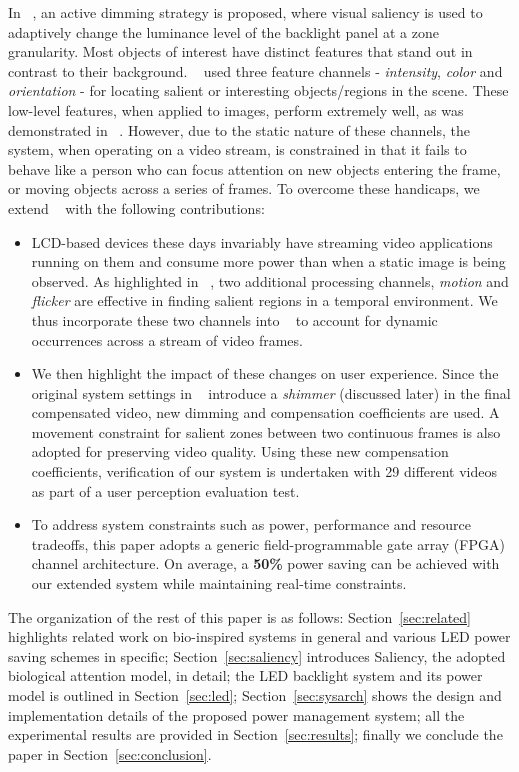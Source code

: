 In ~\cite{DATE2013}, an active dimming strategy is proposed, where visual saliency 
is used to adaptively change the luminance level of the backlight panel at a zone granularity. Most objects of interest
have distinct features that stand out in contrast to their background. 
~\cite{DATE2013} used three feature channels - \emph{intensity}, \emph{color} and \emph{orientation} - for locating salient or 
interesting objects/regions in the scene. These low-level features, when applied to images, 
perform extremely well, as was demonstrated in ~\cite{DATE2013}. However, due to the static nature of these 
channels, the system, when operating on a video stream, is constrained in that it fails to behave 
like a person who can focus attention on new objects entering the frame, or moving objects across a series of frames. 
To overcome these handicaps, we extend ~\cite{DATE2013} with the following contributions:
\begin{itemize}
\item
LCD-based devices these days invariably have streaming video applications running on them and consume more power than when a static image is being observed. 
As highlighted in ~\cite{Peters2007}, two additional processing channels, \emph{motion} and \emph{flicker} are effective in finding salient regions 
in a temporal environment. We thus incorporate these two channels into ~\cite{DATE2013} to account for dynamic occurrences 
across a stream of video frames.
\item
We then highlight the impact of these changes on user experience. 
Since the original system settings in ~\cite{DATE2013} introduce a \emph{shimmer} (discussed later) in the final compensated video, 
new dimming and compensation coefficients are used. A movement constraint for salient zones between two 
continuous frames is also adopted for preserving video quality.
Using these new compensation coefficients, verification of our system is undertaken with 29 different videos as part of a user perception evaluation test.
\item 
To address system constraints such as power, performance and resource tradeoffs,
this paper adopts a generic field-programmable gate array (FPGA) channel architecture. 
On average, a \textbf{50\%} power saving can be achieved with our extended system while maintaining real-time constraints. 
\end{itemize}
The organization of the rest of this paper is as follows: Section~\ref{sec:related} highlights related work on bio-inspired systems in general and various LED power saving schemes in specific; Section~\ref{sec:saliency} introduces Saliency, the adopted biological attention model, in detail; the LED backlight system and its power model is outlined in Section~\ref{sec:led}; Section~\ref{sec:sysarch} shows the design and implementation details of the proposed power management system; all the experimental results are provided in Section~\ref{sec:results}; finally we conclude the paper in Section~\ref{sec:conclusion}.

